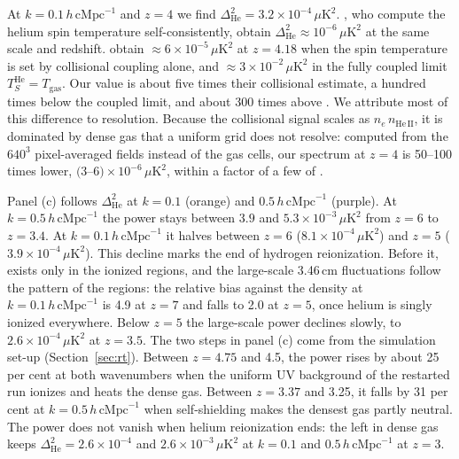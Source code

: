 At $k = 0.1\,h\,\mathrm{cMpc}^{-1}$ and $z = 4$ we find $\Delta^2_\mathrm{He} = 3.2\times10^{-4}\,\mu\mathrm{K}^2$. \citet{Spina2025}, who compute the helium spin temperature self-consistently, obtain $\Delta^2_\mathrm{He} \approx 10^{-6}\,\mu\mathrm{K}^2$ at the same scale and redshift. \citet{Basu2026} obtain $\approx 6\times10^{-5}\,\mu\mathrm{K}^2$ at $z = 4.18$ when the spin temperature is set by collisional coupling alone, and $\approx 3\times10^{-2}\,\mu\mathrm{K}^2$ in the fully coupled limit $T_S^\mathrm{He} = T_\mathrm{gas}$. Our value is about five times their collisional estimate, a hundred times below the coupled limit, and about 300 times above \citet{Spina2025}. We attribute most of this difference to resolution. Because the collisional signal scales as $n_e\,n_\mathrm{He\,II}$, it is dominated by dense gas that a uniform grid does not resolve: computed from the $640^3$ pixel-averaged fields instead of the gas cells, our spectrum at $z = 4$ is 50--100 times lower, $(3$--$6)\times10^{-6}\,\mu\mathrm{K}^2$, within a factor of a few of \citet{Spina2025}.

Panel (c) follows $\Delta^2_\mathrm{He}$ at $k = 0.1$ (orange) and $0.5\,h\,\mathrm{cMpc}^{-1}$ (purple). At $k = 0.5\,h\,\mathrm{cMpc}^{-1}$ the power stays between $3.9$ and $5.3\times10^{-3}\,\mu\mathrm{K}^2$ from $z = 6$ to $z = 3.4$. At $k = 0.1\,h\,\mathrm{cMpc}^{-1}$ it halves between $z = 6$ ($8.1\times10^{-4}\,\mu\mathrm{K}^2$) and $z = 5$ ($3.9\times10^{-4}\,\mu\mathrm{K}^2$). This decline marks the end of hydrogen reionization. Before it,  exists only in the ionized regions, and the large-scale 3.46\,cm fluctuations follow the pattern of the  regions: the relative bias against the density at $k = 0.1\,h\,\mathrm{cMpc}^{-1}$ is 4.9 at $z = 7$ and falls to 2.0 at $z = 5$, once helium is singly ionized everywhere. Below $z = 5$ the large-scale power declines slowly, to $2.6\times10^{-4}\,\mu\mathrm{K}^2$ at $z = 3.5$. The two steps in panel (c) come from the simulation set-up (Section~\ref{sec:rt}). Between $z = 4.75$ and 4.5, the power rises by about 25 per cent at both wavenumbers when the uniform UV background of the restarted run ionizes and heats the dense gas. Between $z = 3.37$ and 3.25, it falls by 31 per cent at $k = 0.5\,h\,\mathrm{cMpc}^{-1}$ when self-shielding makes the densest gas partly neutral. The power does not vanish when helium reionization ends: the  left in dense gas keeps $\Delta^2_\mathrm{He} = 2.6\times10^{-4}$ and $2.6\times10^{-3}\,\mu\mathrm{K}^2$ at $k = 0.1$ and $0.5\,h\,\mathrm{cMpc}^{-1}$ at $z = 3$.


